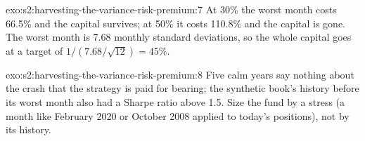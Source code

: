 \begin{solution}{exo:s2:harvesting-the-variance-risk-premium:7}
At 30\% the worst month costs 66.5\% and the capital survives; at 50\% it costs 110.8\% and the capital is gone. The worst month is 7.68 monthly standard
deviations, so the whole capital goes at a target of $1/(7.68/\sqrt{12}) = 45\%$.
\end{solution}

\begin{solution}{exo:s2:harvesting-the-variance-risk-premium:8}
Five calm years say nothing about the crash that the strategy is paid for bearing; the synthetic book's history before its worst month also had a
Sharpe ratio above 1.5. Size the fund by a stress (a month like February 2020 or October 2008 applied to today's positions), not by its history.
\end{solution}

